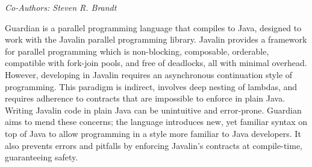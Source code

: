 \begin{center}
\textit{Co-Authors: Steven R.	Brandt}
\end{center} 
Guardian is a parallel programming language that compiles to Java, designed to work with the Javalin parallel programming library. Javalin provides a framework for parallel programming which is non-blocking, composable, orderable, compatible with fork-join pools, and free of deadlocks, all with minimal overhead. However, developing in Javalin requires an asynchronous continuation style of programming. This paradigm is indirect, involves deep nesting of lambdas, and requires adherence to contracts that are impossible to enforce in plain Java. Writing Javalin code in plain Java can be unintuitive and error-prone. Guardian aims to mend these concerns; the language introduces new, yet familiar syntax on top of Java to allow programming in a style more familiar to Java developers. It also prevents errors and pitfalls by enforcing Javalin's contracts at compile-time, guaranteeing safety.
